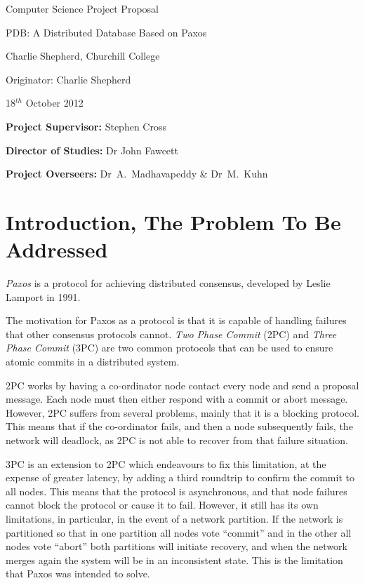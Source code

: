 \vfil

\centerline{\Large Computer Science Project Proposal}
\vspace{0.4in}
\centerline{\Large PDB: A Distributed Database Based on Paxos}
\vspace{0.4in}
\centerline{\large Charlie Shepherd, Churchill College}
\vspace{0.3in}
\centerline{\large Originator: Charlie Shepherd}
\vspace{0.3in}
\centerline{\large 18$^{th}$ October 2012}

\vfil


\noindent
{\bf Project Supervisor:} Stephen Cross
\vspace{0.2in}

\noindent
{\bf Director of Studies:} Dr John Fawcett
\vspace{0.2in}
\noindent

\noindent
{\bf Project Overseers:} Dr~A.~Madhavapeddy \& Dr~M.~Kuhn



\section*{Introduction, The Problem To Be Addressed}

{\em Paxos} is a protocol for achieving distributed consensus, developed by Leslie Lamport in 1991.

The motivation for Paxos as a protocol is that it is capable of handling failures that other
consensus protocols cannot. {\em Two Phase Commit} (2PC) and {\em Three Phase Commit} (3PC) are two common
protocols that can be used to ensure atomic commits in a distributed system.

2PC works by having a co-ordinator node contact every node and send a proposal message. Each node
must then either respond with a commit or abort message. However, 2PC suffers from several
problems, mainly that it is a blocking protocol. This means that if the co-ordinator fails, and
then a node subsequently fails, the network will deadlock, as 2PC is not able to recover from that
failure situation.

3PC is an extension to 2PC which endeavours to fix this limitation, at the expense of greater
latency, by adding a third roundtrip to confirm the commit to all nodes. This means that the
protocol is asynchronous, and that node failures cannot block the protocol or cause it to fail.
However, it still has its own limitations, in particular, in the event of a network partition. If
the network is partitioned so that in one partition all nodes vote ``commit'' and in the other all
nodes vote ``abort'' both partitions will initiate recovery, and when the network merges again the
system will be in an inconsistent state. This is the limitation that Paxos was intended to solve.

